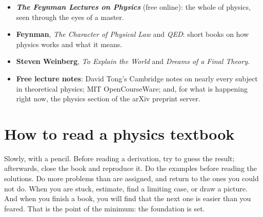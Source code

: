 \begin{itemize}[itemsep=3pt]
  \item \textbf{\emph{The Feynman Lectures on Physics}} (free online): the whole of physics, seen through the eyes of a master.
  \item \textbf{Feynman}, \emph{The Character of Physical Law} and \emph{QED}: short books on how physics works and what it means.
  \item \textbf{Steven Weinberg}, \emph{To Explain the World} and \emph{Dreams of a Final Theory}.
  \item \textbf{Free lecture notes}: David Tong's Cambridge notes on nearly every subject in theoretical physics; MIT OpenCourseWare; and, for what is happening right now, the physics section of the arXiv preprint server.
\end{itemize}

\section*{How to read a physics textbook}

Slowly, with a pencil. Before reading a derivation, try to guess the result; afterwards, close the book and reproduce it. Do the examples before reading the solutions. Do more problems than are assigned, and return to the ones you could not do. When you are stuck, estimate, find a limiting case, or draw a picture. And when you finish a book, you will find that the next one is easier than you feared. That is the point of the minimum: the foundation is set.

